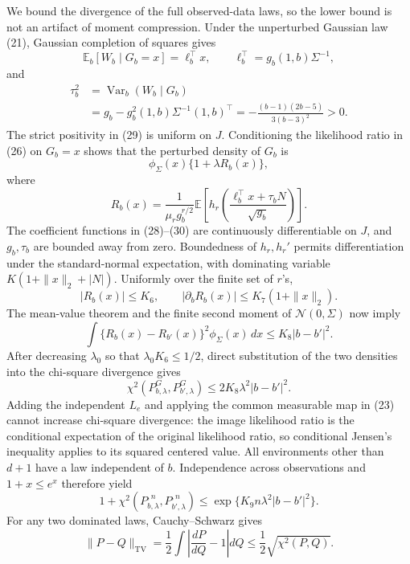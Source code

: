 We bound the divergence of the full observed-data laws, so the lower bound is not an artifact of moment compression.  Under the unperturbed Gaussian law (21), Gaussian completion of squares gives
\[
 \mathbb E_b[W_b\mid G_b=x]=\ell_b^\top x,
 \qquad \ell_b^\top=g_b(1,b)\Sigma^{-1}, \tag{28}
\]
and
\[
 \begin{aligned}
 \tau_b^2
 &=\operatorname{Var}_b(W_b\mid G_b)\\
 &=g_b-g_b^2(1,b)\Sigma^{-1}(1,b)^\top
 =-\frac{(b-1)(2b-5)}{3(b-3)^2}>0.
 \end{aligned} \tag{29}
\]
The strict positivity in (29) is uniform on \(J\).  Conditioning the likelihood ratio in (26) on \(G_b=x\) shows that the perturbed density of \(G_b\) is
\[
 \phi_\Sigma(x)\{1+\lambda R_b(x)\},
\]
where
\[
 R_b(x)=\frac{1}{\mu_rg_b^{r/2}}
 \mathbb E\!\left[
 h_r\!\left(\frac{\ell_b^\top x+\tau_bN}{\sqrt{g_b}}\right)
 \right]. \tag{30}
\]
The coefficient functions in (28)--(30) are continuously differentiable on \(J\), and \(g_b,\tau_b\) are bounded away from zero.  Boundedness of \(h_r,h_r'\) permits differentiation under the standard-normal expectation, with dominating variable \(K(1+\|x\|_2+|N|)\).  Uniformly over the finite set of \(r\)'s,
\[
 |R_b(x)|\leq K_6,
 \qquad |\partial_bR_b(x)|\leq K_7(1+\|x\|_2). \tag{31}
\]
The mean-value theorem and the finite second moment of \(\mathcal N(0,\Sigma)\) now imply
\[
 \int\{R_b(x)-R_{b'}(x)\}^2\phi_\Sigma(x)\,dx
 \leq K_8|b-b'|^2. \tag{32}
\]
After decreasing \(\lambda_0\) so that \(\lambda_0K_6\leq1/2\), direct substitution of the two densities into the chi-square divergence gives
\[
 \chi^2(P^G_{b,\lambda},P^G_{b',\lambda})
 \leq2K_8\lambda^2|b-b'|^2. \tag{33}
\]
Adding the independent \(L_e\) and applying the common measurable map in (23) cannot increase chi-square divergence: the image likelihood ratio is the conditional expectation of the original likelihood ratio, so conditional Jensen's inequality applies to its squared centered value.  All environments other than \(d+1\) have a law independent of \(b\).  Independence across observations and \(1+x\leq e^x\) therefore yield
\[
 1+\chi^2(P_{b,\lambda}^{,n},P_{b',\lambda}^{,n})
 \leq\exp\{K_9n\lambda^2|b-b'|^2\}. \tag{34}
\]
For any two dominated laws, Cauchy--Schwarz gives
\[
 \|P-Q\|_{\mathrm{TV}}
 =\frac12\int\left|\frac{dP}{dQ}-1\right|dQ
 \leq\frac12\sqrt{\chi^2(P,Q)}. \tag{35}
\]

